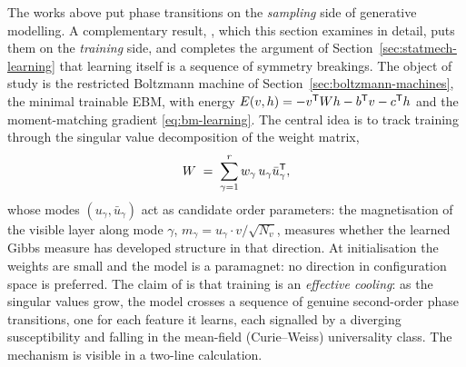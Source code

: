 The works above put phase transitions on the \emph{sampling} side of
generative modelling. A complementary result, \citet{bachtis2024cascade},
which this section examines in detail, puts them on the \emph{training}
side, and completes the argument of Section~\ref{sec:statmech-learning}
that learning itself is a sequence of symmetry breakings. The object of
study is the restricted Boltzmann machine of
Section~\ref{sec:boltzmann-machines}, the minimal trainable EBM, with
energy $E(v, h) = -v^{\mathsf{T}} W h - b^{\mathsf{T}} v - c^{\mathsf{T}} h$ and the moment-matching
gradient \eqref{eq:bm-learning}. The central idea is to track training
through the singular value decomposition of the weight matrix,
\begin{equation}
  W \;=\; \sum_{\gamma=1}^{r} w_\gamma\, u_\gamma \bar u_\gamma^{\mathsf{T}} ,
  \label{eq:rbm-svd}
\end{equation}
whose modes $(u_\gamma, \bar u_\gamma)$ act as candidate order
parameters: the magnetisation of the visible layer along mode $\gamma$,
$m_\gamma = u_\gamma \cdot v / \sqrt{N_v}$, measures whether the learned
Gibbs measure has developed structure in that direction. At
initialisation the weights are small and the model is a paramagnet: no
direction in configuration space is preferred. The claim of
\citet{bachtis2024cascade} is that training is an \emph{effective
cooling}: as the singular values grow, the model crosses a sequence of
genuine second-order phase transitions, one for each feature it learns,
each signalled by a diverging susceptibility and falling in the
mean-field (Curie--Weiss) universality class. The mechanism is visible in
a two-line calculation.

